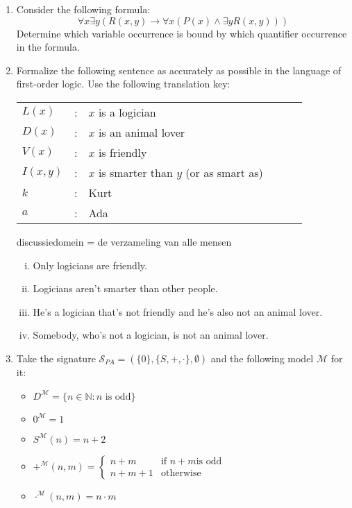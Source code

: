 \begin{enumerate}[\thesubsection.1]
  
  \item Consider the following formula: \[\forall x\exists
      y(R(x,y)\to \forall x(P(x)\land \exists yR(x,y)))\] Determine
    which variable occurrence is bound by which quantifier occurrence
    in the formula.

    \item Formalize the following sentence as accurately as possible in the language of first-order logic. Use the following translation key:

		\begin{tabular}{l c l l c l}

		$L(x)$ & : & $x$ is a logician \\
		
		$D(x)$ & : & $x$ is an animal lover \\

		$V(x)$ & : & $x$ is friendly \\ $I(x,y)$ & : & $x$ is smarter than $y$ (or as smart as)\\ 

		$k$ & : & Kurt \\ $a$ & : & Ada\\

		\end{tabular}
		
		discussiedomein = de verzameling van alle mensen

		\begin{enumerate}[(i)]

			\item Only logicians are friendly.
			
			\item Logicians aren't smarter than other people.

			\item He's a logician that's not friendly and he's also not an animal lover.
			\item Somebody, who's not a logician, is not an animal lover.

		\end{enumerate}

  \item Take the signature $\mathcal{S}_{PA}=(\{0\},
    \{S,+,\cdot\},\emptyset)$ and the following model $\mathcal{M}$ for it:
    \begin{itemize}
    \item $D^\mathcal{M}=\{n\in\mathbb{N}:n\text{ is odd}\}$
    \item $0^\mathcal{M}=1$
    \item $S^\mathcal{M}(n)=n+2$
    \item $+^\mathcal{M}(n,m)=\begin{cases} n+m & \text{if }
        n+m\text{is odd}\\ n+m+1&\text{otherwise}\end{cases}$
      \item $\cdot^\mathcal{M}(n,m)=n\cdot m$
      

\end{itemize}
\end{enumerate}
